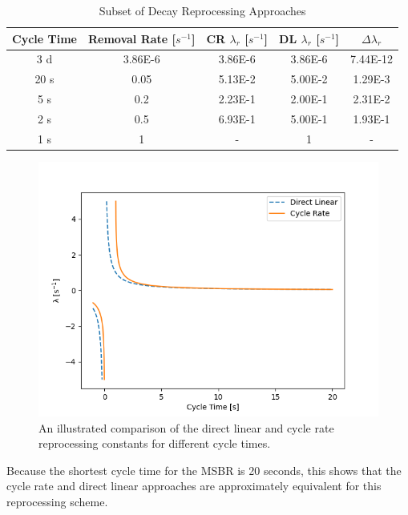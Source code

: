 \begin{table}[H]
\renewcommand{\arraystretch}{1.25}
\caption{Subset of Decay Reprocessing Approaches}
\label{tab:repr_decay_view}
\begin{center}
\begin{tabular}{ c | c | c | c | c }
 \hline
 Cycle Time & Removal Rate [$s^{-1}$] & CR $\lambda_{r}$ [$s^{-1}$] & DL $\lambda_{r}$ [$s^{-1}$] & $\Delta \lambda_{r}$\\
 \hline
 \hline
 3 d & 3.86E-6 & 3.86E-6 & 3.86E-6 & 7.44E-12\\
 20 s & 0.05 & 5.13E-2 & 5.00E-2 & 1.29E-3\\
 5 s & 0.2 & 2.23E-1 & 2.00E-1 & 2.31E-2\\
 2 s & 0.5 & 6.93E-1 & 5.00E-1 & 1.93E-1\\
 1 s & 1 & - & 1 & -\\
 \hline
\end{tabular}
\end{center}
\end{table}

\begin{figure}[H]
  \centering
  \includegraphics[scale=0.7]{images/dl_cr_asymptote.png}
  \caption{An illustrated comparison of the direct linear and cycle rate reprocessing constants for different cycle times.}
   \label{fig:dl_cr_asymptotic}
\end{figure}

Because the shortest cycle time for the MSBR is 20 seconds, this shows that the cycle rate and direct linear approaches are approximately equivalent for this reprocessing scheme.

